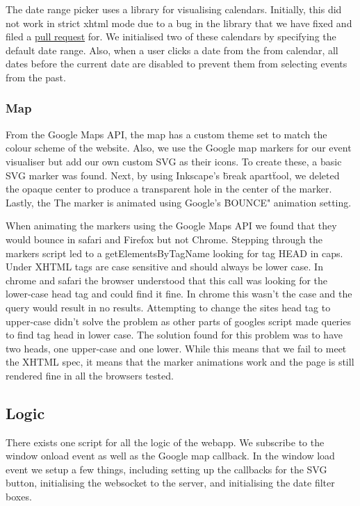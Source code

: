 \documentclass[10pt]{article}
\begin{document}
                The date range picker uses a library for visualising calendars. Initially, this did not work in strict xhtml mode due to a bug in the library that we have fixed and filed a \href{https://github.com/dbushell/Pikaday/pull/526}{pull request} for. We initialised two of these calendars by specifying the default date range. Also, when a user clicks a date from the from calendar, all dates before the current date are disabled to prevent them from selecting events from the past.

            \subsubsection{Map}
                From the Google Maps API, the map has a custom theme set to match the colour scheme of the  website. Also, we use the Google map markers for our event visualiser but add our own custom SVG as their icons. To create these, a basic SVG marker was found. Next, by using Inkscape's \"break apart\" tool, we deleted the opaque center to produce a transparent hole in the center of the marker. Lastly, the The marker is animated using Google's \"BOUNCE" animation setting.

                When animating the markers using the Google Maps API we found that they would bounce in safari and Firefox but not Chrome. Stepping through the markers script led to a getElementsByTagName looking for tag HEAD in caps. Under XHTML tags are case sensitive and should always be lower case. In chrome and safari the browser understood that this call was looking for the lower-case head tag and could find it fine. In chrome this wasn't the case and the query would result in no results. Attempting to change the sites head tag to upper-case didn't solve the problem as other parts of googles script made queries to find tag head in lower case. The solution found for this problem was to have two heads, one upper-case and one lower. While this means that we fail to meet the XHTML spec, it means that the marker animations work and the page is still rendered fine in all the browsers tested.

        \subsection{Logic}
            There exists one script for all the logic of the webapp. We subscribe to the window onload event as well as the Google map callback. In the window load event we setup a few things, including setting up the callbacks for the SVG button, initialising the websocket to the server, and initialising the date filter boxes.
\end{document}
